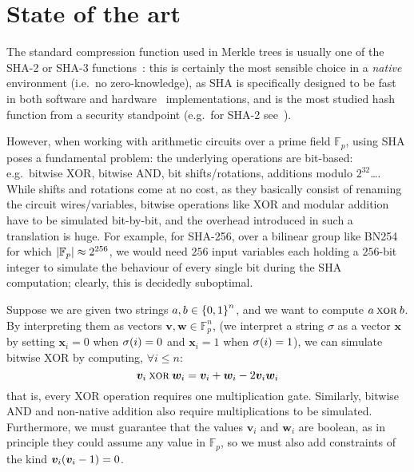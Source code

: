 \section{State of the art}\label{sec:sota}
The standard compression function used in Merkle trees is usually one of the SHA-2 or SHA-3 
functions~\cite{Dang2015}: this is certainly the most sensible choice in a \emph{native} 
environment (i.e.\ no zero-knowledge), as SHA is specifically designed to be fast in both software 
and hardware~\cite{DaddaMO2004,MichailAKTG2012} implementations, and is the most studied hash 
function from a security standpoint (e.g.\ for SHA-2 
see~\cite{KhovratovichRS2012,GuoLRW2010,DobraunigEM2016}).

However, when working with arithmetic circuits over a prime field \(\mathbb{F}_p\), using SHA poses
a fundamental problem: the underlying operations are bit-based: e.g.\ bitwise XOR, bitwise AND, 
bit shifts/rotations, additions modulo \(2^{32}\)\dots.
While shifts and rotations come at no cost, as they basically consist of renaming the circuit 
wires/variables, bitwise operations like XOR and modular addition have to be simulated 
bit-by-bit, and the overhead introduced in such a translation is huge.
For example, for SHA-256, over a bilinear group like BN254 for which 
\(\left\lvert\mathbb{F}_p\right\rvert \approx 2^{256}\), we would need \(256\) input variables each holding a
\(256\)-bit integer to simulate the behaviour of every single bit during the SHA computation; 
clearly, this is decidedly suboptimal.

\begin{example}
  Suppose we are given two strings \(a, b \in \left\{0, 1\right\}^{n}\), and we want to compute 
  \(a \mathbin{\textnormal{\textsc{xor}}} b\).
  By interpreting them as vectors \(\bm{v}, \bm{w} \in \mathbb{F}_{p}^{n}\), (we interpret 
  a string \(\sigma \) as a vector \(\bm{x}\) by setting \(\bm{x}_i = 0\) when 
  \(\call{\sigma}{i} = 0\) and \(\bm{x}_i = 1\) when \(\call{\sigma}{i} = 1\)), we can simulate 
  bitwise XOR by computing, \(\forall i \le n\):
  \[\bm{v}_{i} \mathbin{\textnormal{\textsc{xor}}} \bm{w}_{i} = \bm{v}_{i} + \bm{w}_{i} - 2\bm{v}_{i}\bm{w}_{i}\]
  that is, every XOR operation requires one multiplication gate.
  Similarly, bitwise AND and non-native addition also require multiplications to be simulated.
  Furthermore, we must guarantee that the values \(\bm{v}_i\) and \(\bm{w}_i\) are boolean, as 
  in principle they could assume any value in \(\mathbb{F}_p\), so we must also add constraints of 
  the kind \(\bm{v}_{i}\Parens*{\bm{v}_i - 1} = 0\).
\end{example}

